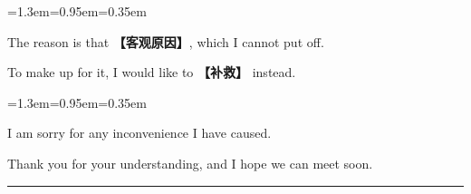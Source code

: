 \documentclass[10pt,a4paper]{ctexart}
\begin{document}
\par\vspace{1pt}
\begin{list}{}{\leftmargin=1.3em=0.95em=0.35em\itemindent=0pt\topsep=0pt\partopsep=0pt\parsep=1.5pt\itemsep=0pt}
\item[{\color{accent}\scriptsize$\blacktriangleright$}]{\footnotesize The reason is that {\color{accent}\bfseries 【客观原因】}, which I cannot put off.}\par{}
\item[{\color{accent}\scriptsize$\blacktriangleright$}]{\footnotesize To make up for it, I would like to {\color{accent}\bfseries 【补救】} instead.}\par{}
\end{list}
\par\vspace{1pt}
\begin{list}{}{\leftmargin=1.3em=0.95em=0.35em\itemindent=0pt\topsep=0pt\partopsep=0pt\parsep=1.5pt\itemsep=0pt}
\item[{\color{accent}\scriptsize$\blacktriangleright$}]{\footnotesize I am sorry for any inconvenience I have caused.}\par{}
\item[{\color{accent}\scriptsize$\blacktriangleright$}]{\footnotesize Thank you for your understanding, and I hope we can meet soon.}\par{}
\end{list}
\par
\endgroup
\vspace{4pt}\par\nopagebreak
{\color{rule}\rule{\linewidth}{0.6pt}}\par\nopagebreak
\end{document}
